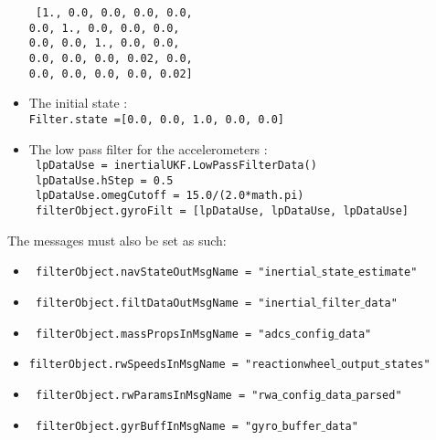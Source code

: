 \begin{itemize}
  \texttt{ [1., 0.0, 0.0, 0.0, 0.0, \\
                          0.0, 1., 0.0, 0.0, 0.0,\\
                          0.0, 0.0, 1., 0.0, 0.0,\\
                          0.0, 0.0, 0.0, 0.02, 0.0,\\
                          0.0, 0.0, 0.0, 0.0, 0.02]}
 \item The initial state :\\
 \texttt{Filter.state =[0.0, 0.0, 1.0, 0.0, 0.0]}
  \item The low pass filter for the accelerometers :\\
    \texttt{ lpDataUse = inertialUKF.LowPassFilterData()}\\
   \texttt{ lpDataUse.hStep = 0.5 }\\
 \texttt{   lpDataUse.omegCutoff = 15.0/(2.0*math.pi) }\\
 \texttt{   filterObject.gyroFilt = [lpDataUse, lpDataUse, lpDataUse] }\\
\end{itemize}

The messages must also be set as such:

\begin{itemize}
\item    \texttt{ filterObject.navStateOutMsgName = "inertial$\_$state$\_$estimate"}
\item    \texttt{ filterObject.filtDataOutMsgName = "inertial$\_$filter$\_$data"}
\item   \texttt{ filterObject.massPropsInMsgName = "adcs$\_$config$\_$data"}
\item   \texttt{filterObject.rwSpeedsInMsgName = "reactionwheel$\_$output$\_$states"}
\item   \texttt{ filterObject.rwParamsInMsgName = "rwa$\_$config$\_$data$\_$parsed"}
\item   \texttt{  filterObject.gyrBuffInMsgName = "gyro$\_$buffer$\_$data"}
\end{itemize}

